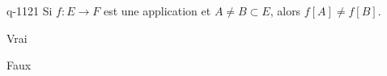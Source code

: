 \begin{truefalse}{q-1121}
Si $f : E \to F$ est une application et $A \neq  B \subset E$, alors $f[A] \neq f[B]$.
\item Vrai
\item* Faux
\end{truefalse}

